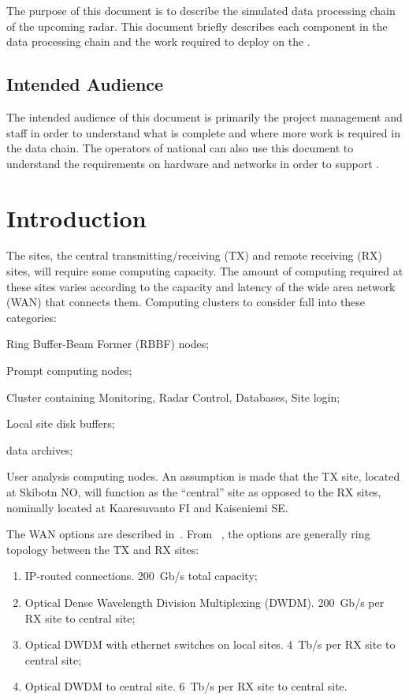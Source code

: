 \documentclass[12pt,a4paper]{article}
\begin{document}
The purpose of this document is to describe the simulated data processing chain of the upcoming \ED radar.
This document briefly describes each component in the data processing chain and the work required to deploy on the .

\subsection{Intended Audience}

The intended audience of this document is primarily the \ED project management and staff in order to understand what is complete and where more work is required in the data chain.
The operators of national  can also use this document to understand the requirements on hardware and networks in order to support \ED.

\section{Introduction}
\label{intro}

The \ED sites, the central transmitting/receiving (TX) and remote receiving (RX) sites, will require some computing capacity.
The amount of computing required at these sites varies according to the capacity and latency of the wide area network (WAN)
that connects them.
Computing clusters to consider fall into these categories:
\bitm
\item Ring Buffer-Beam Former (RBBF) nodes;
\item Prompt computing nodes;
\item Cluster containing Monitoring, Radar Control, Databases, Site login;
\item Local site disk buffers;
\item \ED data archives;
\item User analysis computing nodes.
  \eitm
An assumption is made that the TX site, located at Skibotn NO, will function as the ``central'' site as opposed to the RX sites, nominally located at Kaaresuvanto FI and Kaiseniemi SE.
  
The WAN options are described in~\cite{wan-options}.
From ~\cite{wan-options}, the options are generally ring topology between the TX and RX sites:
\begin{enumerate}
\item IP-routed connections. 200~Gb/s total capacity;
\item Optical Dense Wavelength Division Multiplexing (DWDM). 200~Gb/s per RX site to central site;
\item Optical DWDM with ethernet switches on local sites. 4~Tb/s per RX site to central site;
\item Optical DWDM to central site. 6~Tb/s per RX site to central site.
\end{enumerate}
\end{document}
